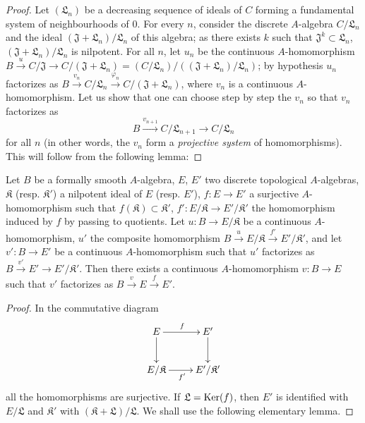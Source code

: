 \begin{proof}
Let $(\mathfrak L_n)$ be a decreasing sequence of ideals of $C$ forming a fundamental system of neighbourhoods of $0$.
For every $n$, consider the discrete $A$-algebra $C/\mathfrak L_n$ and the ideal $(\mathfrak{J}+\mathfrak L_n)/\mathfrak L_n$ of this algebra;
as there exists $k$ such that $\mathfrak{J}^k\subset\mathfrak L_n$, $(\mathfrak{J}+\mathfrak L_n)/\mathfrak L_n$ is nilpotent.
For all $n$, let $u_n$ be the continuous $A$-homomorphism $B\xrightarrow{u}C/\mathfrak{J}\to C/(\mathfrak{J}+\mathfrak L_n)=(C/\mathfrak L_n)/((\mathfrak{J}+\mathfrak L_n)/\mathfrak L_n)$;
by hypothesis $u_n$ factorizes as $B\xrightarrow{v_n}C/\mathfrak L_n\xrightarrow{\varphi_n}C/(\mathfrak{J}+\mathfrak L_n)$, where $v_n$ is a continuous $A$-homomorphism.
Let us show that one can choose step by step the $v_n$ so that $v_n$ factorizes as
\[
  B\xrightarrow{v_{n+1}}C/\mathfrak L_{n+1}\to C/\mathfrak L_n
\]
for all $n$ (in other words, the $v_n$ form a \emph{projective system} of homomorphisms).
This will follow from the following lemma:
\end{proof}

\begin{lemma}[19.3.10.1]
\label{0.19.3.10.1}
Let $B$ be a formally smooth $A$-algebra, $E$, $E'$ two discrete topological $A$-algebras, $\mathfrak K$ \textup{(resp. $\mathfrak K'$)} a nilpotent ideal of $E$ \textup{(resp. $E'$)}, $f:E\to E'$ a surjective $A$-homomorphism such that $f(\mathfrak K)\subset\mathfrak K'$, $f':E/\mathfrak K\to E'/\mathfrak K'$ the homomorphism induced by $f$ by passing to quotients.
Let $u:B\to E/\mathfrak K$ be a continuous $A$-homomorphism, $u'$ the composite homomorphism $B\xrightarrow{u}E/\mathfrak K\xrightarrow{f'}E'/\mathfrak K'$, and let $v':B\to E'$ be a continuous $A$-homomorphism such that $u'$ factorizes as $B\xrightarrow{v'}E'\to E'/\mathfrak K'$.
Then there exists a continuous $A$-homomorphism $v:B\to E$ such that $v'$ factorizes as $B\xrightarrow{v}E\xrightarrow{f}E'$.
\end{lemma}

\begin{proof}
In the commutative diagram
\[
\xymatrix{
  E \ar[r]^f \ar[d] & E' \ar[d] \\
  E/\mathfrak K \ar[r]_{f'} & E'/\mathfrak K'
}
\]
all the homomorphisms are surjective.
If $\mathfrak{L}=\operatorname{Ker}(f)$, then $E'$ is identified with $E/\mathfrak{L}$ and $\mathfrak K'$ with $(\mathfrak K+\mathfrak{L})/\mathfrak{L}$.
We shall use the following elementary lemma.
\end{proof}

